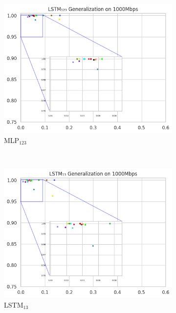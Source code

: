 \documentclass[a4paper,fleqn]{cas-sc}
\begin{document}
\begin{figure}[h!]
\begin{minipage}[t]{0.46\textwidth}
		\begin{subfigure}[t]{0.33\textwidth}
			\includegraphics[draft=false, width=\textwidth]{./figs/Generalizacao-LSTM123-1000Mbps.png} 
			\caption{MLP$_{123}$}
			\label{fig:Generalizacao-MLP123-1000Mbps}
		\end{subfigure}%
		~
		\begin{subfigure}[t]{0.33\textwidth}
			\includegraphics[draft=false, width=\textwidth]{./figs/Generalizacao-LSTM13-1000Mbps.png} 
			\caption{LSTM$_{13}$}
			\label{fig:Generalizacao-LSTM13-1000Mbps}
		\end{subfigure}%
		~
		\begin{subfigure}[t]{0.33\textwidth}

\end{subfigure}
\end{minipage}
\end{figure}
\end{document}

